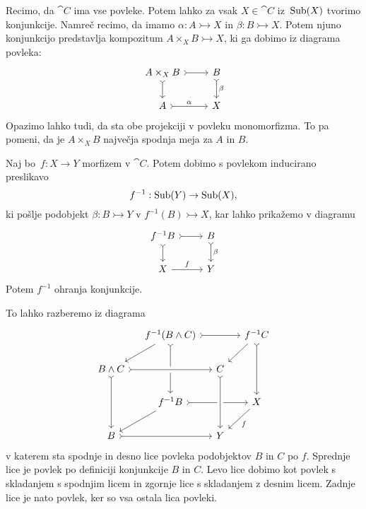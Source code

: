 \documentclass[../kategoricna_logika.tex]{subfiles}
\begin{document}
Recimo, da $\cat{C}$ ima vse povleke.  Potem lahko za vsak
$X \in \cat{C}$ iz~$\operatorname{Sub}(X)$ tvorimo konjunkcije.  Namreč recimo, da
imamo $\alpha : A \rightarrowtail X$ in
${\beta : B \rightarrowtail X}$.  Potem njuno konjunkcijo predstavlja
kompozitum $A \times_X B \rightarrowtail X$, ki ga dobimo iz diagrama
povleka:
\begin{equation*}
  \begin{tikzcd}
    A \times_X B \ar[r, tail] \ar[d, tail] & B \ar[d, tail, "\beta"] \\
    A \ar[r, tail, "\alpha"] & X
  \end{tikzcd}
\end{equation*}
Opazimo lahko tudi, da sta obe projekciji v povleku monomorfizma.  To
pa pomeni, da je $A \times_X B$ največja spodnja meja za $A$ in $B$.
\begin{lema}
Naj bo~$f : X \to Y$ morfizem v $\cat{C}$.  Potem dobimo s povlekom
inducirano preslikavo
$$f^{-1} : \operatorname{Sub}(Y) \to \operatorname{Sub}(X),$$
ki pošlje podobjekt $\beta : B \rightarrowtail Y$ v
$f^{-1}(B) \rightarrowtail X$, kar lahko prikažemo v diagramu
\begin{equation*}
  \begin{tikzcd}
    f^{-1}B \ar[r, tail] \ar[d, tail] & B \ar[d, tail, "\beta"] \\
    X \ar[r, "f"] & Y
  \end{tikzcd}
\end{equation*}
  Potem $f^{-1}$ ohranja konjunkcije.
\end{lema}
\begin{dokaz}
  To lahko razberemo iz diagrama
  \begin{equation*}
    \begin{tikzcd}[column sep=small, row sep=normal]
      & f^{-1}(B \land C) \ar[dl] \ar[dd, tail] \ar[rr, tail] & & f^{-1}C \ar[dl] \ar[dd, tail] \\
      B \land C \ar[dd, tail] \ar[rr, crossing over, tail] & & C  & \\
      & f^{-1}B \ar[dl] \ar[rr, tail] & & X \ar[dl, "f"] \\
      B \ar[rr, tail] & & Y \ar[from=uu, crossing over, tail] &
    \end{tikzcd}
  \end{equation*}
  v katerem sta spodnje in desno lice povleka podobjektov $B$ in $C$ po $f$.
  Sprednje lice je povlek po definiciji konjunkcije $B$ in $C$.
  Levo lice dobimo kot povlek s skladanjem s spodnjim licem in
  zgornje lice s skladanjem z desnim licem.
  Zadnje lice je nato povlek, ker so vsa ostala lica povleki.
\end{dokaz}
\end{document}
